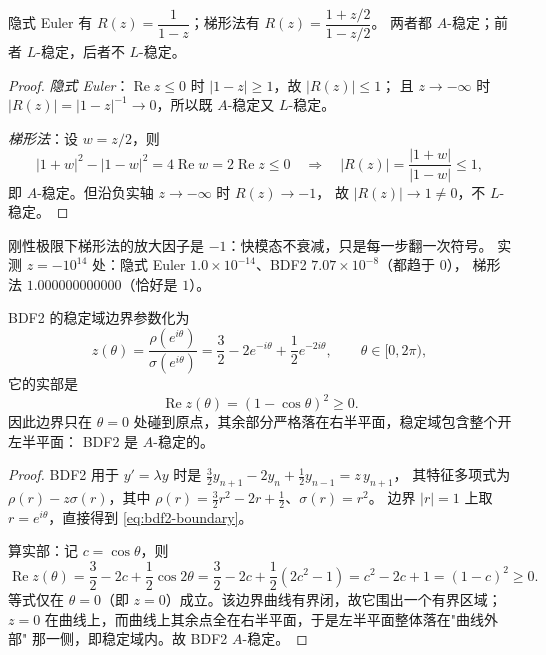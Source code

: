 \begin{theorem}
隐式 Euler 有 $R(z)=\dfrac1{1-z}$；梯形法有 $R(z)=\dfrac{1+z/2}{1-z/2}$。
两者都 $A$-稳定；前者 $L$-稳定，后者不 $L$-稳定。
\end{theorem}

\begin{proof}
\emph{隐式 Euler}：$\operatorname{Re}z\le0$ 时 $|1-z|\ge1$，故 $|R(z)|\le1$；
且 $z\to-\infty$ 时 $|R(z)|=|1-z|^{-1}\to0$，所以既 $A$-稳定又 $L$-稳定。

\emph{梯形法}：设 $w=z/2$，则
\[
  |1+w|^2-|1-w|^2=4\operatorname{Re}w=2\operatorname{Re}z\le0
  \quad\Longrightarrow\quad |R(z)|=\frac{|1+w|}{|1-w|}\le1,
\]
即 $A$-稳定。但沿负实轴 $z\to-\infty$ 时 $R(z)\to-1$，
故 $|R(z)|\to1\ne0$，不 $L$-稳定。
\end{proof}

\begin{remark}[不 $L$-稳定的代价]
刚性极限下梯形法的放大因子是 $-1$：快模态不衰减，只是每一步翻一次符号。
实测 $z=-10^{14}$ 处：隐式 Euler $1.0\times10^{-14}$、BDF2 $7.07\times10^{-8}$（都趋于 $0$），
梯形法 $1.000000000000$（恰好是 $1$）。
\end{remark}

\begin{theorem}
\label{thm:bdf2}
BDF2 的稳定域边界参数化为
\begin{equation}
  z(\theta)=\frac{\rho(e^{i\theta})}{\sigma(e^{i\theta})}
          =\frac32-2e^{-i\theta}+\frac12e^{-2i\theta},\qquad\theta\in[0,2\pi),
  \label{eq:bdf2-boundary}
\end{equation}
它的实部是
\begin{equation}
  \operatorname{Re}z(\theta)=(1-\cos\theta)^2\ge0 .
  \label{eq:bdf2-real}
\end{equation}
因此边界只在 $\theta=0$ 处碰到原点，其余部分严格落在右半平面，稳定域包含整个开左半平面：
BDF2 是 $A$-稳定的。
\end{theorem}

\begin{proof}
BDF2 用于 $y'=\lambda y$ 时是
$\tfrac32y_{n+1}-2y_n+\tfrac12y_{n-1}=z\,y_{n+1}$，
其特征多项式为 $\rho(r)-z\sigma(r)$，其中
$\rho(r)=\tfrac32r^2-2r+\tfrac12$、$\sigma(r)=r^2$。
边界 $|r|=1$ 上取 $r=e^{i\theta}$，直接得到 \eqref{eq:bdf2-boundary}。

算实部：记 $c=\cos\theta$，则
\[
  \operatorname{Re}z(\theta)=\frac32-2c+\frac12\cos2\theta
  =\frac32-2c+\frac12(2c^2-1)=c^2-2c+1=(1-c)^2\ge0 .
\]
等式仅在 $\theta=0$（即 $z=0$）成立。该边界曲线有界闭，故它围出一个有界区域；
$z=0$ 在曲线上，而曲线上其余点全在右半平面，于是左半平面整体落在"曲线外部"
那一侧，即稳定域内。故 BDF2 $A$-稳定。
\end{proof}

